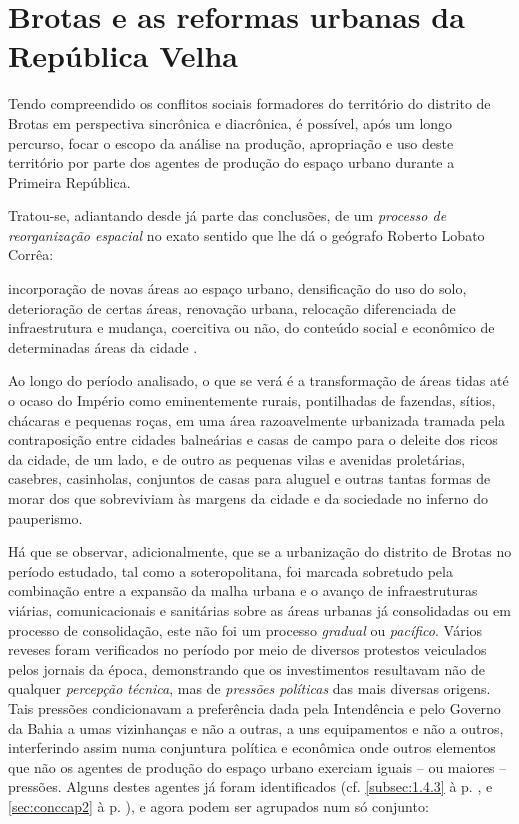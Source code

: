 \chapter{Brotas e as reformas urbanas da República Velha}\label{cap:3}

Tendo compreendido os conflitos sociais formadores do território do distrito de Brotas em perspectiva sincrônica e diacrônica, é possível, após um longo percurso, focar o escopo da análise na produção, apropriação e uso deste território por parte dos agentes de produção do espaço urbano durante a Primeira República. 

Tratou-se, adiantando desde já parte das conclusões, de um \textit{processo de reorganização espacial} no exato sentido que lhe dá o geógrafo Roberto Lobato Corrêa:

\begin{citacao}
incorporação de novas áreas ao espaço urbano, densificação do uso do solo, deterioração de certas áreas, renovação urbana, relocação diferenciada de infraestrutura e mudança, coercitiva ou não, do conteúdo social e econômico de determinadas áreas da cidade \cite[p.~7]{CORREA1985espa}.
\end{citacao}

Ao longo do período analisado, o que se verá é a transformação de áreas tidas até o ocaso do Império como eminentemente rurais, pontilhadas de fazendas, sítios, chácaras e pequenas roças, em uma área razoavelmente urbanizada tramada pela contraposição entre cidades balneárias e casas de campo para o deleite dos ricos da cidade, de um lado, e de outro as pequenas vilas e avenidas proletárias, casebres, casinholas, conjuntos de casas para aluguel e outras tantas formas de morar dos que sobreviviam às margens da cidade e da sociedade no inferno do pauperismo.

Há que se observar, adicionalmente, que se a urbanização do distrito de Brotas no período estudado, tal como a soteropolitana, foi marcada sobretudo pela combinação entre a expansão da malha urbana e o avanço de infraestruturas viárias, comunicacionais e sanitárias sobre as áreas urbanas já consolidadas ou em processo de consolidação, este não foi um processo \textit{gradual} ou \textit{pacífico}. Vários reveses foram verificados no período por meio de diversos protestos veiculados pelos jornais da época, demonstrando que os investimentos resultavam não de qualquer \textit{percepção técnica}, mas de \textit{pressões políticas} das mais diversas origens. Tais pressões condicionavam a preferência dada pela Intendência e pelo Governo da Bahia a umas vizinhanças e não a outras, a uns equipamentos e não a outros, interferindo assim numa conjuntura política e econômica onde outros elementos que não os agentes de produção do espaço urbano exerciam iguais -- ou maiores -- pressões. Alguns destes agentes já foram identificados (cf. \autoref{subsec:1.4.3} à p. \pageref{subsec:1.4.3}, e \autoref{sec:conccap2} à p. \pageref{sec:conccap2}), e agora podem ser agrupados num só conjunto:

